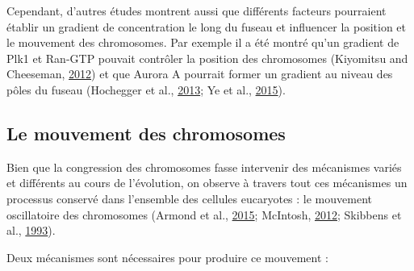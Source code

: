 \documentclass[12pt,a4paper,twoside,openright]{book}
\begin{document}
Cependant, d'autres études montrent aussi que différents facteurs
pourraient établir un gradient de concentration le long du fuseau et
influencer la position et le mouvement des chromosomes. Par exemple il a
été montré qu'un gradient de Plk1 et Ran-GTP pouvait contrôler la
position des chromosomes (Kiyomitsu and Cheeseman,
\hyperref[ref-Kiyomitsu2012]{2012}) et que Aurora A pourrait former un
gradient au niveau des pôles du fuseau (Hochegger et al.,
\hyperref[ref-Hochegger2013]{2013}; Ye et al.,
\hyperref[ref-Ye2015]{2015}).

\subsection{Le mouvement des
chromosomes}\label{le-mouvement-des-chromosomes}

Bien que la congression des chromosomes fasse intervenir des mécanismes
variés et différents au cours de l'évolution, on observe à travers tout
ces mécanismes un processus conservé dans l'ensemble des cellules
eucaryotes : le mouvement oscillatoire des chromosomes (Armond et al.,
\hyperref[ref-Armond2015]{2015}; McIntosh,
\hyperref[ref-McIntosh2012]{2012}; Skibbens et al.,
\hyperref[ref-Skibbens1993]{1993}).

Deux mécanismes sont nécessaires pour produire ce mouvement :
\end{document}
